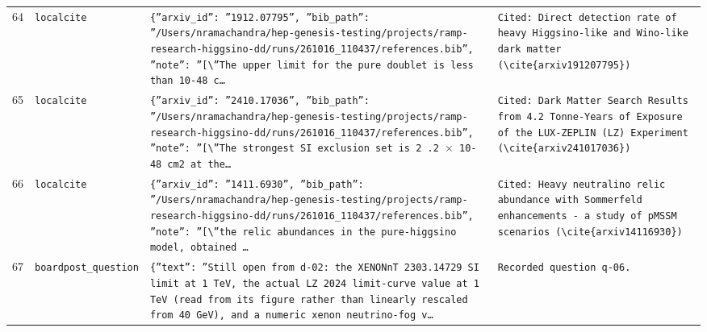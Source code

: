 \documentclass[11pt,a4paper]{article}
\begin{document}
\begin{longtable}{@{}p{}p{}p{}p{}@{}}
64 & \texttt{local}\newline\texttt{cite} & \texttt{\{''arxiv\_\allowbreak{}id'':\allowbreak{} ''1912.07795'',\allowbreak{} ''bib\_\allowbreak{}path'':\allowbreak{} ''/\allowbreak{}Users/\allowbreak{}nramachandra/\allowbreak{}hep-genesis-testing/\allowbreak{}projects/\allowbreak{}ramp-research-higgsino-dd/\allowbreak{}runs/\allowbreak{}261016\_\allowbreak{}110437/\allowbreak{}references.bib'',\allowbreak{} ''note'':\allowbreak{} ''[\textbackslash{}\allowbreak{}''The upper limit for the pure doublet is less than 10-48 c\ldots{}\allowbreak{}} & \texttt{Cited:\allowbreak{} Direct detection rate of heavy Higgsino-like and Wino-like dark matter (\textbackslash{}\allowbreak{}cite\{arxiv191207795\}\allowbreak{})\allowbreak{}} \\
65 & \texttt{local}\newline\texttt{cite} & \texttt{\{''arxiv\_\allowbreak{}id'':\allowbreak{} ''2410.17036'',\allowbreak{} ''bib\_\allowbreak{}path'':\allowbreak{} ''/\allowbreak{}Users/\allowbreak{}nramachandra/\allowbreak{}hep-genesis-testing/\allowbreak{}projects/\allowbreak{}ramp-research-higgsino-dd/\allowbreak{}runs/\allowbreak{}261016\_\allowbreak{}110437/\allowbreak{}references.bib'',\allowbreak{} ''note'':\allowbreak{} ''[\textbackslash{}\allowbreak{}''The strongest SI exclusion set is 2 .2 $\times$ 10-48 cm2 at the\ldots{}\allowbreak{}} & \texttt{Cited:\allowbreak{} Dark Matter Search Results from 4.2 Tonne-Years of Exposure of the LUX-ZEPLIN (LZ)\allowbreak{} Experiment (\textbackslash{}\allowbreak{}cite\{arxiv241017036\}\allowbreak{})\allowbreak{}} \\
66 & \texttt{local}\newline\texttt{cite} & \texttt{\{''arxiv\_\allowbreak{}id'':\allowbreak{} ''1411.6930'',\allowbreak{} ''bib\_\allowbreak{}path'':\allowbreak{} ''/\allowbreak{}Users/\allowbreak{}nramachandra/\allowbreak{}hep-genesis-testing/\allowbreak{}projects/\allowbreak{}ramp-research-higgsino-dd/\allowbreak{}runs/\allowbreak{}261016\_\allowbreak{}110437/\allowbreak{}references.bib'',\allowbreak{} ''note'':\allowbreak{} ''[\textbackslash{}\allowbreak{}''the relic abundances in the pure-higgsino model,\allowbreak{} obtained \ldots{}\allowbreak{}} & \texttt{Cited:\allowbreak{} Heavy neutralino relic abundance with Sommerfeld enhancements - a study of pMSSM scenarios (\textbackslash{}\allowbreak{}cite\{arxiv14116930\}\allowbreak{})\allowbreak{}} \\
67 & \texttt{board}\newline\texttt{post\_\allowbreak{}question} & \texttt{\{''text'':\allowbreak{} ''Still open from d-02:\allowbreak{} the XENONnT 2303.14729 SI limit at 1 TeV,\allowbreak{} the actual LZ 2024 limit-curve value at 1 TeV (read from its figure rather than linearly rescaled from 40 GeV)\allowbreak{},\allowbreak{} and a numeric xenon neutrino-fog v\ldots{}\allowbreak{}} & \texttt{Recorded question q-06.} \\

\end{longtable}
\end{document}
